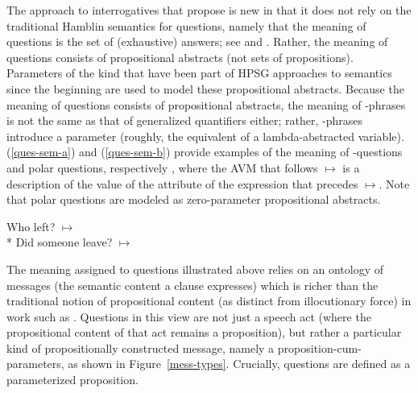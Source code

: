 \documentclass[output=paper
 	        ,biblatex
                ,babelshorthands
                ,newtxmath
                ,draftmode
                ,colorlinks, citecolor=brown
]{langscibook}
\begin{document}
The approach to interrogatives that \citeauthor{GinzburgandSag2001} propose is new in that it does not rely on the traditional Hamblin semantics for questions, namely that the meaning of questions is the set of (exhaustive) answers; see \citet{Hamblin1973} and \citet{GroenendijkandStokhoff1997}. Rather, the meaning of questions consists of propositional abstracts (not sets of propositions). Parameters of the kind that have been part of HPSG approaches to semantics since the beginning are used to model these propositional abstracts. Because the meaning of questions consists of propositional abstracts, the meaning of  -phrases is not the same as that of generalized quantifiers either; rather, -phrases introduce a parameter (roughly, the equivalent of a lambda-abstracted variable). (\ref{ques-sem-a}) and (\ref{ques-sem-b}) provide examples of the meaning of -questions and polar questions, respectively \citep[137]{GinzburgandSag2001}, where the AVM that follows $\mapsto$ is a description of the value of the  attribute of the expression that precedes $\mapsto$. Note that polar questions are modeled as zero-parameter propositional abstracts.

\begin{exe}
\ex 
\begin{xlist}
\ex \label{ques-sem-a}
Who left? $\mapsto$ \\*
\ex\label{ques-sem-b}
Did someone leave? $\mapsto$ \\
\end{xlist}
\end{exe}


The meaning assigned to questions illustrated above relies on an ontology of messages (the semantic content a clause expresses) which is richer than the traditional notion of propositional content (as distinct from illocutionary force) in work such as \citet{Searle1969}. Questions in this view are not just a speech act (where the propositional content of that act remains a proposition), but rather a particular kind of propositionally constructed message, namely a proposition-cum-parameters, as shown in Figure~\ref{mess-types}. Crucially, questions are defined as a parameterized proposition.
\end{document}
